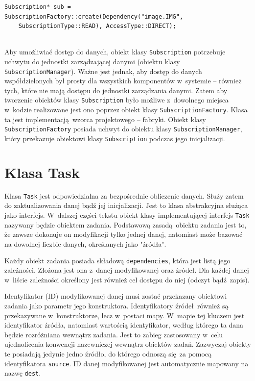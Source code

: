 \begin{minipage}{\textwidth}
	\begin{lstlisting}[label=subscription:direct, caption={Przykład tworzenia obiektu klasy \lstinline$Subscription$ z~bezpośrednim dostępem do danych },alsoletter={()[].=}]
Subscription* sub = SubscriptionFactory::create(Dependency("image.IMG",
	SubscriptionType::READ), AccessType::DIRECT);
	
	\end{lstlisting}
\end{minipage}

Aby umożliwiać dostęp do danych, obiekt klasy \lstinline$Subscription$ potrzebuje uchwytu do jednostki zarządzającej danymi (obiektu klasy \lstinline$SubscriptionManager$). Ważne jest jednak, aby dostęp do danych współdzielonych był prosty dla wszystkich komponentów w~systemie -- również tych, które nie mają dostępu do jednostki zarządzania danymi. Zatem aby tworzenie obiektów klasy \lstinline$Subscription$ było możliwe z~dowolnego miejsca w~kodzie realizowane jest ono poprzez obiekt klasy \lstinline$SubscriptionFactory$. Klasa ta jest implementacją wzorca projektowego -- fabryki. Obiekt klasy \lstinline$SubscriptionFactory$ posiada uchwyt do obiektu klasy \lstinline$SubscriptionManager$, który przekazuje obiektowi klasy \lstinline$Subscription$ podczas jego inicjalizacji. 

\section{Klasa Task}
Klasa \lstinline$Task$ jest odpowiedzialna za bezpośrednie obliczenie danych. Służy zatem do zaktualizowania danej bądź jej inicjalizacji. Jest to klasa abstrakcyjna służąca jako interfejs. W~dalszej części tekstu obiekt klasy implementującej interfejs \lstinline$Task$ nazywany będzie obiektem zadania. Podstawową zasadą obiektu zadania jest to, że zawsze dokonuje on modyfikacji tylko jednej danej, natomiast może bazować na dowolnej liczbie danych, określanych jako "źródła". 

Każdy obiekt zadania posiada składową \lstinline$dependencies$, która jest listą jego zależności. Złożona jest ona z~danej modyfikowanej oraz źródeł. Dla każdej danej w~liście zależności określony jest również cel dostępu do niej (odczyt bądź zapis).

Identyfikator (ID) modyfikowanej danej musi zostać przekazany obiektowi zadania jako parametr jego konstruktora. Identyfikatory źródeł również są przekazywane w~konstruktorze, lecz w~postaci mapy. W~mapie tej kluczem jest identyfikator źródła, natomiast wartością identyfikator, według którego ta dana będzie rozróżniana wewnątrz zadania. Jest to zabieg zastosowany w~celu ujednolicenia konwencji nazewniczej wewnątrz obiektów zadań. Zazwyczaj obiekty te posiadają jedynie jedno źródło, do którego odnoszą się za pomocą identyfikatora \lstinline$source$. ID danej modyfikowanej jest automatycznie mapowany na nazwę \lstinline$dest$. 

